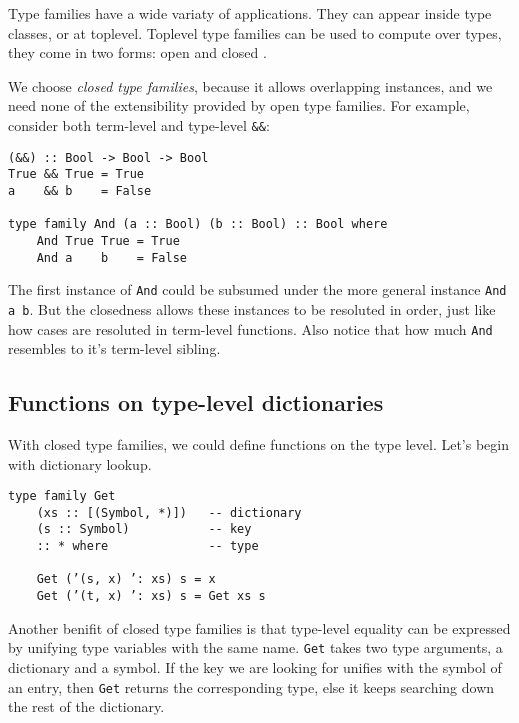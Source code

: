 \documentclass[pldi]{sigplanconf-pldi16}
\begin{document}
Type families have a wide variaty of applications. They can appear inside type
classes\cite{tfclass}\cite{tfsynonym}, or at toplevel. Toplevel type families
can be used to compute over types, they come in two forms: open\cite{tfopen} and
closed \cite{tfclosed}.

We choose \emph{closed type families}, because it allows overlapping instances,
and we need none of the extensibility provided by open type families.
For example, consider both term-level and type-level \texttt{&&}:

\begin{verbatim}
(&&) :: Bool -> Bool -> Bool
True && True = True
a    && b    = False

type family And (a :: Bool) (b :: Bool) :: Bool where
    And True True = True
    And a    b    = False
\end{verbatim}

The first instance of \texttt{And} could be subsumed
under the more general instance \texttt{And a b}.
But the closedness allows these instances to be resoluted in order, just like
how cases are resoluted in term-level functions. Also notice that how much
\texttt{And} resembles to it's term-level sibling.

\subsection{Functions on type-level dictionaries}

With closed type families, we could define functions on the type level.
Let's begin with dictionary lookup.

\begin{verbatim}
type family Get
    (xs :: [(Symbol, *)])   -- dictionary
    (s :: Symbol)           -- key
    :: * where              -- type

    Get (’(s, x) ’: xs) s = x
    Get (’(t, x) ’: xs) s = Get xs s
\end{verbatim}

Another benifit of closed type families is that type-level equality can be
expressed by unifying type variables with the same name.
\texttt{Get} takes two type arguments, a dictionary and a symbol.
If the key we are looking for unifies with the symbol of an entry, then
 \texttt{Get} returns the corresponding type, else it keeps
 searching down the rest of the dictionary.
\end{document}
